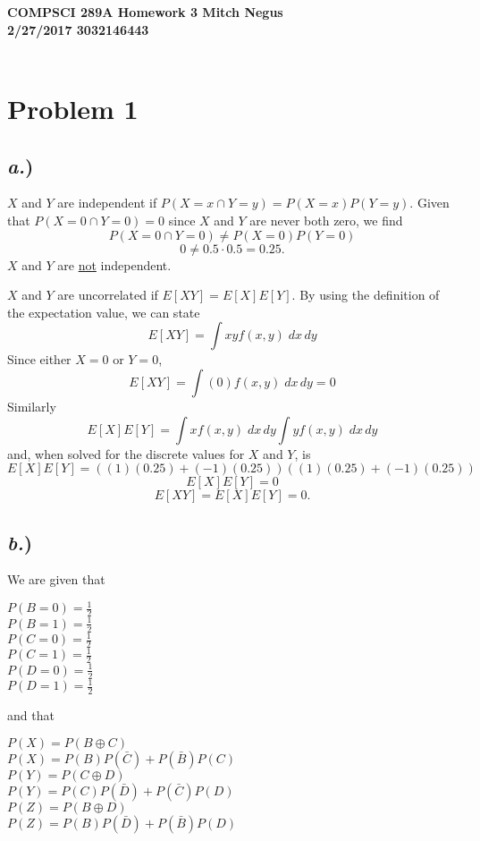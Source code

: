 \documentclass{report}
\begin{document}
\thispagestyle{empty}

{\bf {\large {COMPSCI 289A} Homework {3} \hfill Mitch Negus\\
		2/27/2017 						\hfill	3032146443}}\\\\


\section*{Problem 1}

\subsection*{\textit{a.})}

$X$ and $Y$ are independent if $P(X=x \cap Y=y) = P(X=x)P(Y=y)$. Given that $P(X=0 \cap Y=0) = 0$ since $X$ and $Y$ are never both zero, we find
$$ P(X=0 \cap Y=0) \neq P(X=0)P(Y=0) $$
$$ 0 \neq 0.5 \cdot 0.5 = 0.25 .$$
$X$ and $Y$ are \underline{not} independent.

$X$ and $Y$ are uncorrelated if $E[XY] = E[X]E[Y]$. By using the definition of the expectation value, we can state
$$ E[XY] = \int{xy f(x,y) \;dx\,dy} $$ 
Since either $X=0$ or $Y=0$, 
$$ E[XY] = \int{(0) f(x,y) \;dx\,dy} = 0 $$
Similarly
$$ E[X]E[Y] = \int{x f(x,y) \;dx\,dy} \int{y f(x,y) \;dx\,dy} $$
and, when solved for the discrete values for $X$ and $Y$, is
$$ E[X]E[Y] = \left( (1)(0.25) + (-1)(0.25) \right) \left( (1)(0.25) + (-1)(0.25) \right) $$
$$ E[X]E[Y] = 0 $$
$$\boxed{ E[XY] = E[X]E[Y] = 0 }.$$


\subsection*{\textit{b.})}
We are given that 
\begin{multicols}{3}
$ P(B=0) = \frac{1}{2} $ \\
$ P(B=1) = \frac{1}{2} $ \\

$ P(C=0) = \frac{1}{2} $ \\
$ P(C=1) = \frac{1}{2} $ \\

$ P(D=0) = \frac{1}{2} $ \\
$ P(D=1) = \frac{1}{2} $ \\
\end{multicols}
and that
\begin{multicols}{3}
$ P(X) = P(B \oplus C) $ \\
$ P(X) = P(B)P(\bar{C}) + P(\bar{B})P(C) $\\

$ P(Y) = P(C \oplus D)  $ \\
$ P(Y) = P(C)P(\bar{D}) + P(\bar{C})P(D) $\\

$ P(Z) = P(B \oplus D)  $ \\
$ P(Z) = P(B)P(\bar{D}) + P(\bar{B})P(D) $\\
\end{multicols}
\end{document}
